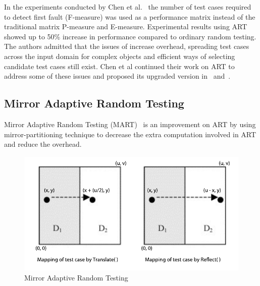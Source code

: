 In the experiments conducted by Chen et al.~\cite{Chen2008} the number of test cases required to detect first fault (F-measure) was used as a performance matrix instead of the traditional matrix P-measure and E-measure. Experimental results using ART showed up to 50\% increase in performance compared to ordinary random testing. The authors admitted that the issues of increase overhead, spreading test cases across the input domain for complex objects and efficient ways of selecting candidate test cases still exist. Chen et al continued their work on ART to address some of these issues and proposed its upgraded version in~\cite{chen2009enhanced} and~\cite{Chen2005}. 

\subsection{Mirror Adaptive Random Testing}
Mirror Adaptive Random Testing (MART)~\cite{Chen2003} is an improvement on ART by using mirror-partitioning technique to decrease the extra computation involved in ART and reduce the overhead.

\begin{figure}[h]
\begin{center}
	\includegraphics[width=13cm, height=6cm ]{chapter2/mart2.pdf}
	\caption{Mirror Adaptive Random Testing~\cite{Chen2003}}
\label{fig:mirrorART}
\end{center}  
\end{figure}

